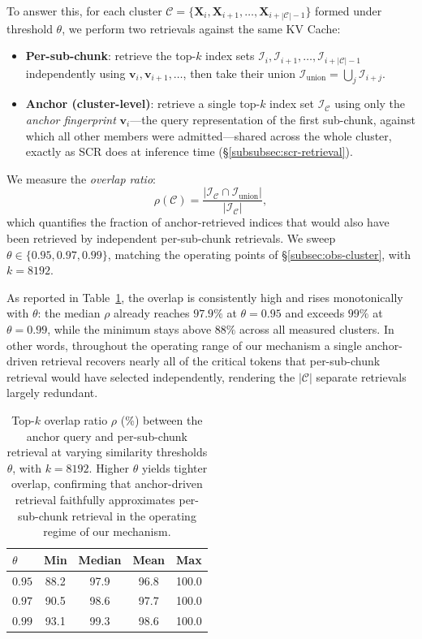 \documentclass[10pt,conference]{IEEEtran}
\begin{document}
To answer this, for each cluster $\mathcal{C} = \{\mathbf{X}_i, \mathbf{X}_{i+1},
\ldots, \mathbf{X}_{i+|\mathcal{C}|-1}\}$ formed under threshold 
$\theta$, we perform two retrievals against the same KV Cache:
\begin{itemize}
    \item \textbf{Per-sub-chunk}: retrieve the top-$k$ index sets 
    $\mathcal{I}_i, \mathcal{I}_{i+1}, \ldots, \mathcal{I}_{i+|\mathcal{C}|-1}$ 
    independently using $\mathbf{v}_i, \mathbf{v}_{i+1}, \ldots$, then 
    take their union 
    $\mathcal{I}_{\text{union}} = \bigcup_{j} \mathcal{I}_{i+j}$.
    \item \textbf{Anchor (cluster-level)}: retrieve a single top-$k$
    index set $\mathcal{I}_{\mathcal{C}}$ using only the \emph{anchor
    fingerprint} $\mathbf{v}_i$---the query representation of the first
    sub-chunk, against which all other members were admitted---shared
    across the whole cluster, exactly as SCR does at inference time
    (§\ref{subsubsec:scr-retrieval}).
\end{itemize}
We measure the \textit{overlap ratio}:
\begin{equation}
    \rho(\mathcal{C}) = \frac{|\mathcal{I}_{\mathcal{C}} \cap \mathcal{I}_{\text{union}}|}{|\mathcal{I}_{\mathcal{C}}|},
    \label{eq:overlap-ratio}
\end{equation}
which quantifies the fraction of anchor-retrieved indices that would
also have been retrieved by independent per-sub-chunk retrievals. We
sweep $\theta \in \{0.95, 0.97, 0.99\}$, matching the operating points 
of §\ref{subsec:obs-cluster}, with $k = 8192$.

As reported in Table~\ref{tab:topk-overlap}, the overlap is
consistently high and rises monotonically with $\theta$: the median
$\rho$ already reaches $97.9\%$ at $\theta = 0.95$ and exceeds $99\%$
at $\theta = 0.99$, while the minimum stays above $88\%$ across all
measured clusters. In other words, throughout the operating range of
our mechanism a single anchor-driven retrieval recovers nearly all of
the critical tokens that per-sub-chunk retrieval would have selected
independently, rendering the $|\mathcal{C}|$ separate retrievals
largely redundant.

\begin{table}[t]
\centering
\caption{Top-$k$ overlap ratio $\rho$ (\%) between the anchor query and
per-sub-chunk retrieval at varying similarity thresholds $\theta$,
with $k = 8192$. Higher $\theta$ yields tighter overlap, confirming
that anchor-driven retrieval faithfully approximates per-sub-chunk
retrieval in the operating regime of our mechanism.}
\label{tab:topk-overlap}
\small
\begin{tabular}{lcccc}
\toprule
$\theta$ & Min & Median & Mean & Max \\
\midrule
$0.95$ & 88.2 & 97.9 & 96.8 & 100.0 \\
$0.97$ & 90.5 & 98.6 & 97.7 & 100.0 \\
$0.99$ & 93.1 & 99.3 & 98.6 & 100.0 \\
\bottomrule
\end{tabular}
\end{table}
\end{document}
